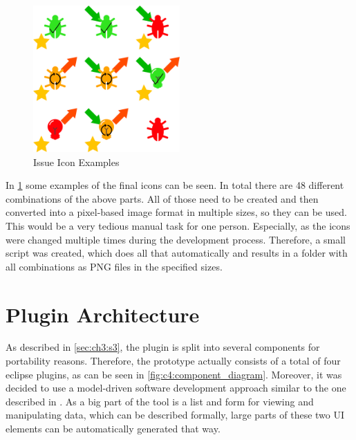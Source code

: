 \begin{figure}[!h]
	\centering
	\includegraphics[width=0.5\textwidth]{graphics/iconCombinations.png}
	\caption{Issue Icon Examples}
	\label{fig:c4:icon_combinations}
\end{figure}
In \cref{fig:c4:icon_combinations} some examples of the final icons can be seen.
In total there are 48 different combinations of the above parts.
All of those need to be created and then converted into a pixel-based image format in multiple sizes, so they can be used.
This would be a very tedious manual task for one person.
Especially, as the icons were changed multiple times during the development process.
Therefore, a small script was created, which does all that automatically and results in a folder with all combinations as \gls{PNG} files in the specified sizes.

\section{Plugin Architecture}
\label{sec:ch4:s3}
As described in \cref{sec:ch3:s3}, the plugin is split into several components for portability reasons.
Therefore, the prototype actually consists of a total of four eclipse plugins, as can be seen in \cref{fig:c4:component_diagram}.
Moreover, it was decided to use a model-driven software development approach similar to the one described in \cite{beydeda2005model}.
As a big part of the tool is a list and form for viewing and manipulating data, which can be described formally,
large parts of these two \gls{UI} elements can be automatically generated that way.


